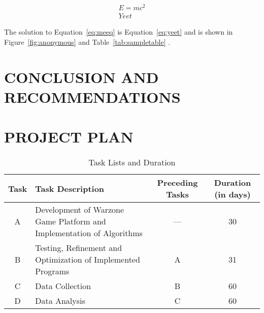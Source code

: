 \documentclass{strrespaper-trad}
\begin{document}
	        \begin{eqnarray}
	            E = mc^2 \label{eq:meeq} \\
	            Yeet \label{eq:yeet}
	        \end{eqnarray}

	        The solution to Equation~\ref{eq:meeq} is Equation~\ref{eq:yeet} and is shown in Figure~\ref{fig:anonymous} and Table~\ref{tab:sampletable} \autocite{al-shemmeriWindTurbines2010}.

    \section{CONCLUSION AND RECOMMENDATIONS}
	    \lipsum[2-4]

    \literaturecited{}

    \appendix

    \section{PROJECT PLAN}
	    \begin{table}[htbp]
	        \centering
	        \caption{Task Lists and Duration}
	        \label{tab:task_lists_duration}
	        \begin{tabularx}{\linewidth}{cXcc}
	            \toprule
	            Task & Task Description                                                      & Preceding Tasks & Duration (in days) \\
	            \midrule
	            A    & Development of Warzone Game Platform and Implementation of Algorithms & ---             & 30                 \\
	            B    & Testing, Refinement and Optimization of Implemented Programs          & A               & 31                 \\
	            C    & Data Collection                                                       & B               & 60                 \\
	            D    & Data Analysis                                                         & C               & 60                 \\
	            \bottomrule
	        \end{tabularx}
	    \end{table}
\end{document}
